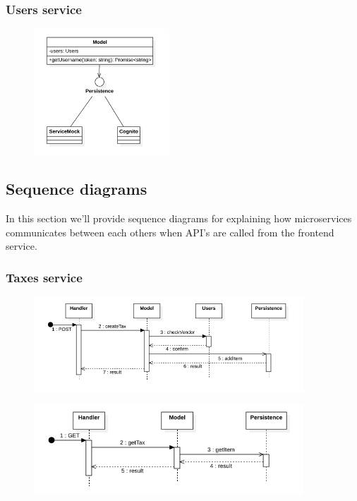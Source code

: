 \subsubsection{Users service}
\begin{figure}[H]
    \includegraphics[width=0.45\textwidth]{res/images/class-diagrams/users.png}
\end{figure}


\subsection{Sequence diagrams}
In this section we'll provide sequence diagrams for explaining how microservices communicates between each others
when API's are called from the frontend service.

\subsubsection{Taxes service}
\begin{figure}[H]
    \includegraphics[width=0.9\textwidth]{res/images/sequence-diagrams/taxes/createTax.png}
\end{figure}

\begin{figure}[H]
    \includegraphics[width=0.9\textwidth]{res/images/sequence-diagrams/taxes/getTax.png}
\end{figure}

